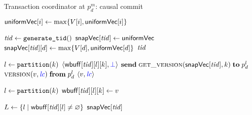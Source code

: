 
\begin{algorithm*}[t]
  \caption{Transaction coordinator at $p^{m}_{d}$: causal commit}
  \label{alg:unistore-coord}
  \begin{algorithmic}[1]
    \Function{\starttx}{$\vc$} \label{line:function-start}
        \label{line:start-uniformvc-index}
        \State ${\sf uniformVec}[i] \gets \max\{V[i], {\sf uniformVec}[i]\}$
        \label{line:start-uniformvc}
      \EndFor

       $\mathit{tid} \gets \texttt{generate\_tid}()$
        \label{line:start-tid}
      \State ${\sf snapVec}[\mathit{tid}] \gets {\sf uniformVec}$
        \label{line:start-snapvc}
      \State ${\sf snapVec}[\mathit{tid}][d] \gets \max\{V[d], {\sf uniformVec}[d]\}$
        \label{line:start-snapvc-d}
      \State \strongcolor{$\snapVC[\tidvar][\strongentry] \gets
        \max\set{\vc[\strongentry], \stableVC[\strongentry]}$}
        \label{line:start-snapvc-strong}
      \State \Return $\mathit{tid}$
        \label{line:start-return}
        \label{line:start-snapshotvc-of-t}
    \EndFunction

    \Statex
      \label{line:function-doread}
      \State \var $l \gets \mathtt{partition}(k)$
        \label{line:doread-partition-of-k}
      \If{$\wbuff[\tidvar][l][k] \neq \bot$}
        \label{line:doread-from-buffer}
        \State \Return $\langle {\sf wbuff}[\mathit{tid}][l][k], \textcolor{blue}{\bot} \rangle$
          \label{line:doread-return-from-buffer}
      \EndIf
      \State $\send \Call{\readkey}{\snapVC[\tidvar], k} \sendto p^{l}_{d}$
        \label{line:doread-from-snapshot}
      \State \wait\receive $\textsc{version}(v, \textcolor{blue}{\mathit{lc}}) \;{\bf from}\; p^{l}_{d}$
      \State {}
        \label{line:doread-readset}
      \State \Return $\langle v, \textcolor{blue}{\mathit{lc}} \rangle$
        \label{line:doread-return-from-snapshot}
    \EndFunction

    \Statex
        \label{line:function-doupdate}
      \State \var $l \gets \mathtt{partition}(k)$
        \label{line:doupdate-partitionof-k}
      \State ${\sf wbuff}[\mathit{tid}][l][k] \gets v$
        \label{line:doupdate-wbuff}
      \State {}
        \label{line:doupdate-readset}
    \EndFunction

    \Statex
    \Function{\commitcausal}{$\tidvar, \lccolor{\lcvar}$}
      \label{line:function-commitcausal}
      \State \var $L \gets \{l \mid {\sf wbuff}[\mathit{tid}][l] \neq \varnothing\}$
        \label{line:commitcausal-ro}
        \State \Return ${\sf snapVec}[\mathit{tid}]$
        \label{line:commitcausal-return-ro}
        \label{line:commitcausal-commitvc-of-t-ro}
      \EndIf


\end{algorithmic}
\end{algorithm*}
